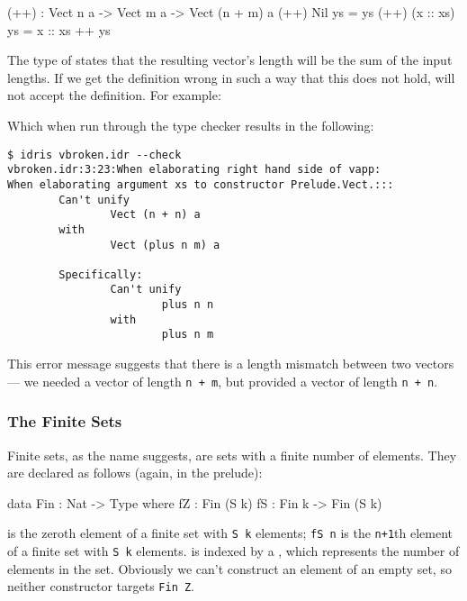 \begin{code}
(++) : Vect n a -> Vect m a -> Vect (n + m) a
(++) Nil       ys = ys
(++) (x :: xs) ys = x :: xs ++ ys
\end{code}

\noindent
The type of \tFN{(++)} states that the resulting vector's length will be the sum of the input lengths.
If we get the definition wrong in such a way that this does not hold, \Idris{} will not accept the definition.
For example:


\noindent
Which when run through the \Idris{} type checker results in the following:

\begin{lstlisting}[style=stdout]
$ idris vbroken.idr --check
vbroken.idr:3:23:When elaborating right hand side of vapp:
When elaborating argument xs to constructor Prelude.Vect.:::
        Can't unify
                Vect (n + n) a
        with
                Vect (plus n m) a
        
        Specifically:
                Can't unify
                        plus n n
                with
                        plus n m
\end{lstlisting}

\noindent
This error message suggests that there is a length mismatch between two vectors
--- we needed a vector of length \texttt{n + m}, but provided a vector of length
\texttt{n + n}.


\subsubsection{The Finite Sets}

Finite sets, as the name suggests, are sets with a finite number of elements.
They are declared as follows (again, in the prelude):

\begin{code}
data Fin : Nat -> Type where
   fZ : Fin (S k)
   fS : Fin k -> Fin (S k)
\end{code}

\noindent
{} is the zeroth element of a finite set with \texttt{S k} elements; \texttt{fS n} is the \texttt{n+1}th element of a finite set with \texttt{S k} elements.
 is indexed by a , which represents the number of elements in the set.
Obviously we can't construct an element of an empty set, so neither constructor targets \texttt{Fin Z}.


